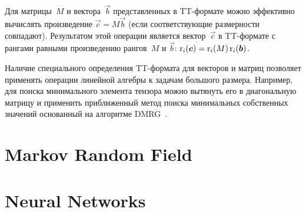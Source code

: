 Для матрицы~$M$ и вектора~$\vec{b}$ представленных в TT\hyp{}формате можно эффективно вычислять произведение $\vec{c}=M\vec{b}$ (если соответствующие размерности совпадают). Результатом этой операции является вектор~$\vec{c}$ в TT\hyp{}формате с рангами равными произведению рангов~$M$ и $\vec{b}$: $\operatorname{r}_i(\boldsymbol{c}) = \operatorname{r}_i(M) \operatorname{r}_i(\boldsymbol{b})$.

Наличие специального определения TT\hyp{}формата для векторов и матриц позволяет применять операции линейной алгебры к задачам большого размера. Например, для поиска минимального элемента тензора можно вытянуть его в диагональную матрицу и применить приближенный метод поиска минимальных собственных значений основанный на алгоритме DMRG~\cite{khoromskij2010dmrg}.

\section{Markov Random Field} \label{sec:mrf}
\section{Neural Networks} \label{sec:cnn}
